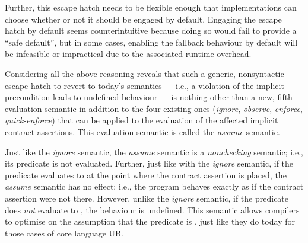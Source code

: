 {Further, this escape hatch needs to be flexible enough that implementations can choose whether or not it should be engaged by default. Engaging the escape hatch by default seems counterintuitive because doing so would fail to provide a ``safe default'', but in some cases, enabling the fallback behaviour by default will be infeasible or impractical due to the associated runtime overhead.

Considering all the above reasoning reveals that such a generic, nonsyntactic escape hatch to revert to today's semantics --- i.e., a violation of the implicit precondition leads to undefined behaviour --- is nothing other than a new, fifth evaluation semantic in addition to the four existing ones (\emph{ignore}, \emph{observe}, \emph{enforce}, \emph{quick-enforce}) that can be applied to the evaluation of the affected implicit contract assertions. This evaluation semantic is called the \emph{assume} semantic.

Just like the \emph{ignore} semantic, the \emph{assume} semantic is a \emph{nonchecking} semantic; i.e., its predicate is not evaluated. Further, just like with the \emph{ignore} semantic, if the predicate evaluates to  at the point where the contract assertion is placed, the \emph{assume} semantic has no effect; i.e., the program behaves exactly as if the contract assertion were not there. However, unlike the \emph{ignore} semantic, if the predicate does \emph{not} evaluate to , the behaviour is undefined. This semantic allows compilers to optimise on the assumption that the predicate is , just like they do today for those cases of core language UB.

}

